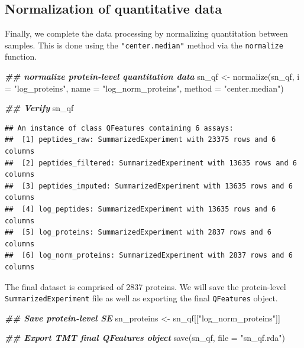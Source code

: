 \documentclass[9pt,a4paper,]{extarticle}
\newenvironment{Shaded}{\begin{snugshade}}{\end{snugshade}}
\newcommand{\AttributeTok}[1]{\textcolor[rgb]{0.77,0.63,0.00}{#1}}
\newcommand{\DocumentationTok}[1]{\textcolor[rgb]{0.56,0.35,0.01}{\textbf{\textit{#1}}}}
\newcommand{\FunctionTok}[1]{\textcolor[rgb]{0.00,0.00,0.00}{#1}}
\newcommand{\NormalTok}[1]{#1}
\newcommand{\OtherTok}[1]{\textcolor[rgb]{0.56,0.35,0.01}{#1}}
\newcommand{\StringTok}[1]{\textcolor[rgb]{0.31,0.60,0.02}{#1}}
\begin{document}
\hypertarget{normalization-of-quantitative-data-1}{%
\subsection{Normalization of quantitative data}\label{normalization-of-quantitative-data-1}}

Finally, we complete the data processing by normalizing quantitation between
samples. This is done using the \texttt{"center.median"} method via the \texttt{normalize}
function.

\begin{Shaded}
\begin{Highlighting}[]
\DocumentationTok{\#\# normalize protein{-}level quantitation data}
\NormalTok{sn\_qf }\OtherTok{\textless{}{-}} \FunctionTok{normalize}\NormalTok{(sn\_qf,}
                   \AttributeTok{i =} \StringTok{"log\_proteins"}\NormalTok{,}
                   \AttributeTok{name =} \StringTok{"log\_norm\_proteins"}\NormalTok{,}
                   \AttributeTok{method =} \StringTok{"center.median"}\NormalTok{)}

\DocumentationTok{\#\# Verify}
\NormalTok{sn\_qf}
\end{Highlighting}
\end{Shaded}

\begin{verbatim}
## An instance of class QFeatures containing 6 assays:
##  [1] peptides_raw: SummarizedExperiment with 23375 rows and 6 columns 
##  [2] peptides_filtered: SummarizedExperiment with 13635 rows and 6 columns 
##  [3] peptides_imputed: SummarizedExperiment with 13635 rows and 6 columns 
##  [4] log_peptides: SummarizedExperiment with 13635 rows and 6 columns 
##  [5] log_proteins: SummarizedExperiment with 2837 rows and 6 columns 
##  [6] log_norm_proteins: SummarizedExperiment with 2837 rows and 6 columns
\end{verbatim}

The final dataset is comprised of 2837 proteins.
We will save the protein-level \texttt{SummarizedExperiment} file as well as exporting
the final \texttt{QFeatures} object.

\begin{Shaded}
\begin{Highlighting}[]
\DocumentationTok{\#\# Save protein{-}level SE}
\NormalTok{sn\_proteins }\OtherTok{\textless{}{-}}\NormalTok{ sn\_qf[[}\StringTok{"log\_norm\_proteins"}\NormalTok{]]}

\DocumentationTok{\#\# Export TMT final QFeatures object}
\FunctionTok{save}\NormalTok{(sn\_qf, }\AttributeTok{file =} \StringTok{"sn\_qf.rda"}\NormalTok{)}
\end{Highlighting}
\end{Shaded}
\end{document}
